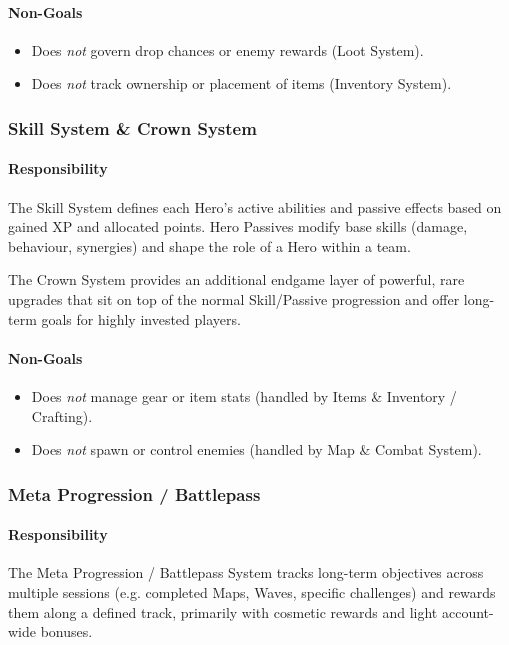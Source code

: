 \paragraph{Non-Goals}
\begin{itemize}
	\item Does \emph{not} govern drop chances or enemy rewards (Loot System).
	\item Does \emph{not} track ownership or placement of items (Inventory System).
\end{itemize}


\subsubsection*{Skill System \& Crown System}

\paragraph{Responsibility}
The Skill System defines each Hero's active abilities and passive effects based on gained XP and allocated points. 
Hero Passives modify base skills (damage, behaviour, synergies) and shape the role of a Hero within a team.

The Crown System provides an additional endgame layer of powerful, rare upgrades that sit on top of the normal 
Skill/Passive progression and offer long-term goals for highly invested players.

\paragraph{Non-Goals}
\begin{itemize}
	\item Does \emph{not} manage gear or item stats (handled by Items \& Inventory / Crafting).
	\item Does \emph{not} spawn or control enemies (handled by Map \& Combat System).
\end{itemize}


\subsubsection*{Meta Progression / Battlepass}

\paragraph{Responsibility}
The Meta Progression / Battlepass System tracks long-term objectives across multiple sessions 
(e.g. completed Maps, Waves, specific challenges) and rewards them along a defined track, primarily 
with cosmetic rewards and light account-wide bonuses.

